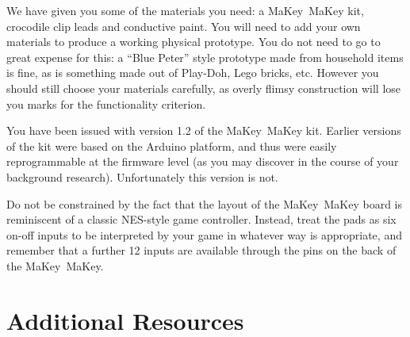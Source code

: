\documentclass{../fal_assignment}
\begin{document}
We have given you some of the materials you need: a MaKey~MaKey kit, crocodile clip leads and conductive paint.
You will need to add your own materials to produce a working physical prototype.
You do not need to go to great expense for this: a ``Blue Peter'' style prototype made from
household items is fine, as is something made out of Play-Doh, Lego bricks, etc.
However you should still choose your materials carefully, as overly flimsy construction will
lose you marks for the functionality criterion.

You have been issued with version 1.2 of the MaKey~MaKey kit.
Earlier versions of the kit were based on the Arduino platform, and thus were easily reprogrammable at the firmware level
(as you may discover in the course of your background research).
Unfortunately this version is not.

Do not be constrained by the fact that the layout of the MaKey~MaKey board is reminiscent of a
classic NES-style game controller.
Instead, treat the pads as six on-off inputs to be interpreted by your game in whatever way is appropriate,
and remember that a further 12 inputs are available through the pins on the back of the MaKey~MaKey.

\section*{Additional Resources}
\end{document}
